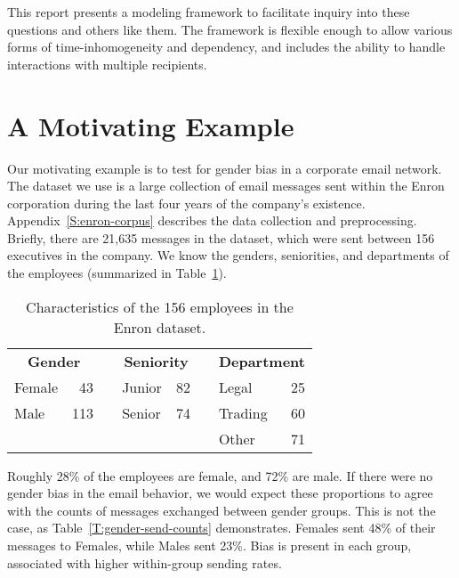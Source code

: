 \documentclass[aoas,preprint]{imsart}
\begin{document}
This report presents a modeling framework to facilitate inquiry into
these questions and others like them. The framework is flexible enough to
allow various forms of time-inhomogeneity and dependency, and includes the
ability to handle interactions with multiple recipients. 


\section{A Motivating Example}

Our motivating example is to test for gender bias in a corporate email
network.  The dataset we use is a large collection of email messages sent
within the Enron corporation during the last four years of the company's
existence.  Appendix~\ref{S:enron-corpus} describes the data collection and
preprocessing.  Briefly, there are 21,635 messages in the dataset, which
were sent between 156 executives in the company.  We know the genders,
seniorities, and departments of the employees (summarized in
Table~\ref{T:employees}).

\begin{table}[h]
    \begin{tabular}{lrclrclr}
        \toprule
        \multicolumn{2}{c}{\textbf{Gender}}
        & & \multicolumn{2}{c}{\textbf{Seniority}}
        & & \multicolumn{2}{c}{\textbf{Department}} \\
        \cmidrule{1-2} \cmidrule{4-5} \cmidrule{7-8}
        Female &  43 && Junior    & 82 && Legal      & 25 \\
        Male   & 113 && Senior    & 74 && Trading    & 60 \\
               &     &&           &    && Other      & 71 \\
        \bottomrule
    \end{tabular}
    \caption{
        Characteristics of the 156 employees in the Enron dataset.
    }
    \label{T:employees}
\end{table}

Roughly 28\% of the employees are female, and 72\% are male.  If there were
no gender bias in the email behavior, we would expect these proportions to
agree with the counts of messages exchanged between gender groups.  This
is not the case, as Table~\ref{T:gender-send-counts} demonstrates.  Females
sent 48\% of their messages to Females, while Males sent 23\%.  Bias is
present in each group, associated with higher within-group sending rates.
\end{document}
